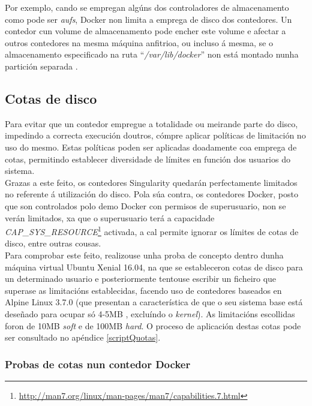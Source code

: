 Por exemplo, cando se empregan algúns dos controladores de almacenamento como pode ser \textit{aufs}, Docker non limita a emprega de disco dos contedores. Un contedor cun volume de almacenamento pode encher este volume e afectar a outros contedores na mesma máquina anfitrioa, ou incluso á mesma, se o almacenamento especificado na ruta ``{\it /var/lib/docker}'' non está montado nunha partición separada \cite{To-Docker-Or-Not-To-Docker}.

\subsection{Cotas de disco}
\label{quotas}

Para evitar que un contedor empregue a totalidade ou meirande parte do disco, impedindo a correcta execución doutros, cómpre aplicar políticas de limitación no uso do mesmo. Estas políticas poden ser aplicadas doadamente coa emprega de cotas, permitindo establecer diversidade de límites en función dos usuarios do sistema.\\

Grazas a este feito, os contedores Singularity quedarán perfectamente limitados no referente á utilización do disco. Pola súa contra, os contedores Docker, posto que son controlados polo demo Docker con permisos de superusuario, non se verán limitados, xa que o superusuario terá a capacidade {\it CAP\_SYS\_RESOURCE}\footnote{\url{http://man7.org/linux/man-pages/man7/capabilities.7.html}} activada, a cal permite ignorar os límites de cotas de disco, entre outras cousas.\\

Para comprobar este feito, realizouse unha proba de concepto dentro dunha máquina virtual Ubuntu Xenial 16.04, na que se estableceron cotas de disco para un determinado usuario e posteriormente tentouse escribir un ficheiro que superase as limitacións establecidas, facendo uso de contedores baseados en Alpine Linux 3.7.0 (que presentan a característica de que o seu sistema base está deseñado para ocupar só 4-5MB , excluíndo o \textit{kernel}). As limitacións escollidas foron de 10MB \textit{soft} e de 100MB \textit{hard}. O proceso de aplicación destas cotas pode ser consultado no apéndice \ref{scriptQuotas}.

\subsubsection{Probas de cotas nun contedor Docker}

